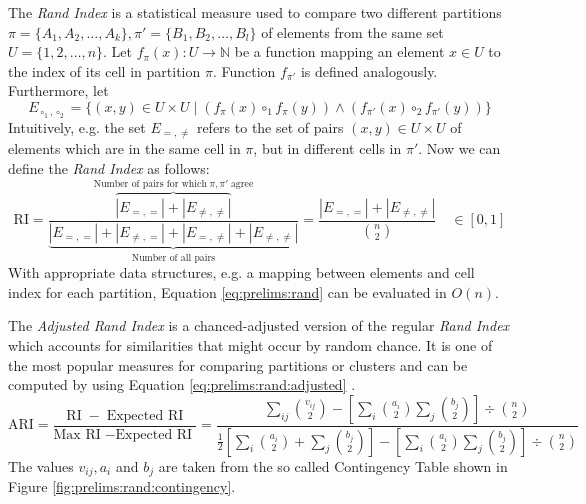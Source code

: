 		The \textit{Rand Index} is a statistical measure used to compare two different partitions $\pi = \{ A_1, A_2, \ldots, A_k \}, \pi' = \{ B_1, B_2, \ldots, B_l \}$ of elements from the same set $U = \{ 1, 2, \ldots, n \}$.
		Let $f_\pi(x): U \rightarrow \mathbb{N}$ be a function mapping an element $x \in U$ to the index of its cell in partition $\pi$. Function $f_{\pi'}$ is defined analogously.
		Furthermore, let
		\begin{equation*}
			E_{\circ_1, \circ_2} = \{ (x, y) \in U \times U \mid (f_\pi(x) \circ_1 f_\pi(y)) \land (f_{\pi'}(x) \circ_2 f_{\pi'}(y)) \}
		\end{equation*}
		Intuitively, e.g. the set $E_{=, \not=}$ refers to the set of pairs $(x, y) \in U \times U$ of elements which are in the same cell in $\pi$, but in different cells in $\pi'$.
		Now we can define the \textit{Rand Index} as follows:
		\begin{equation}
			\label{eq:prelims:rand}
			\mathrm{RI} = \frac{\overbrace{|E_{=, =}| + |E_{\not=, \not=}|}^{\text{Number of pairs for which}\; \pi, \pi' \;\text{agree}}}{\underbrace{|E_{=, =}| + |E_{\not=, =}| + |E_{=, \not=}| + |E_{\not=, \not=}|}_{\text{Number of all pairs}}} = \frac{|E_{=, =}| + |E_{\not=, \not=}|}{\binom{n}{2}} \quad \in [0, 1]
		\end{equation}
		With appropriate data structures, e.g. a mapping between elements and cell index for each partition, Equation \ref{eq:prelims:rand} can be evaluated in $O(n)$.
		
		The \textit{Adjusted Rand Index} is a chanced-adjusted version of the regular \textit{Rand Index} which accounts for similarities that might occur by random chance.
		It is one of the most popular measures for comparing partitions or clusters and can be computed by using Equation \ref{eq:prelims:rand:adjusted} \cite{sundqvistAdjustingAdjustedRand2020}.
		\begin{equation}
			\label{eq:prelims:rand:adjusted}
			\mathrm{ARI} = \frac{\mathrm{RI}\; - \;\text{Expected RI}}{\text{Max RI}\; - \text{Expected RI} \;} = \frac{\sum\nolimits_{ij} \binom{v_{ij}}{2} - \left[ \sum\nolimits_i \binom{a_i}{2} \sum\nolimits_j \binom{b_j}{2} \right] \div \binom{n}{2}}{\frac{1}{2} \left[ \sum\nolimits_i \binom{a_i}{2} +  \sum\nolimits_j \binom{b_j}{2} \right] - \left[ \sum\nolimits_i \binom{a_i}{2} \sum\nolimits_j \binom{b_j}{2} \right] \div \binom{n}{2}}
		\end{equation}
		The values $v_{ij}, a_i$ and $b_j$ are taken from the so called Contingency Table shown in Figure \ref{fig:prelims:rand:contingency}.
		
